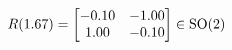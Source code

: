 \documentclass[preview]{standalone}
\begin{document}
\begin{align*}
\special{dvisvgm:raw <g id='unique000'>}R(1.67) = \begin{bmatrix} -0.10 & -1.00 \\ 1.00 & -0.10 \end{bmatrix} \in \text{SO}(2)\special{dvisvgm:raw </g>}
\end{align*}
\end{document}
